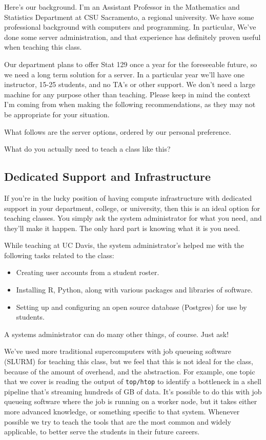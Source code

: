 \documentclass[12pt]{article}
\begin{document}
Here's our background.
I'm an Assistant Professor in the Mathematics and Statistics Department at CSU Sacramento, a regional university.
We have some professional background with computers and programming.
In particular, We've done some server administration, and that experience has definitely proven useful when teaching this class.


Our department plans to offer Stat 129 once a year for the foreseeable future, so we need a long term solution for a server.
In a particular year we'll have one instructor, 15-25 students, and no TA's or other support.
We don't need a large machine for any purpose other than teaching.
Please keep in mind the context I'm coming from when making the following recommendations, as they may not be appropriate for your situation.

What follows are the server options, ordered by our personal preference.

What do you actually need to teach a class like this?

\subsection{Dedicated Support and Infrastructure}

If you're in the lucky position of having compute infrastructure with dedicated support in your department, college, or university, then this is an ideal option for teaching classes.
You simply ask the system administrator for what you need, and they'll make it happen.
The only hard part is knowing what it is you need.

While teaching at UC Davis, the system administrator's helped me with the following tasks related to the class:
\begin{itemize}
\item Creating user accounts from a student roster.
\item Installing R, Python, along with various packages and libraries of software.
\item Setting up and configuring an open source database (Postgres) for use by students.
\end{itemize}

A systems administrator can do many other things, of course.
Just ask!

We've used more traditional supercomputers with job queueing software (SLURM) for teaching this class, but we feel that this is not ideal for the class, because of the amount of overhead, and the abstraction.
For example, one topic that we cover is reading the output of \texttt{top/htop} to identify a bottleneck in a shell pipeline that's streaming hundreds of GB of data.
It's possible to do this with job queueing software where the job is running on a worker node, but it takes either more advanced knowledge, or something specific to that system.
Whenever possible we try to teach the tools that are the most common and widely applicable, to better serve the students in their future careers.
\end{document}
